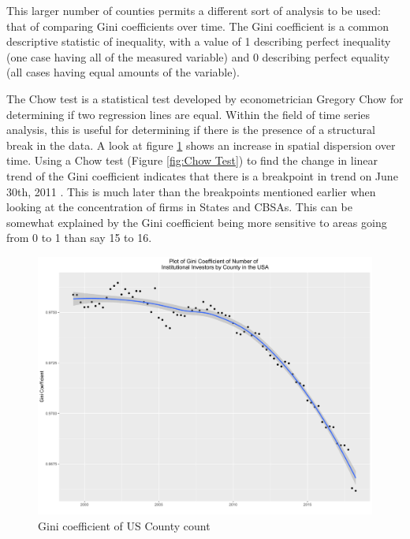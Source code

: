 This larger number of counties permits a different sort of analysis to be used: that of comparing Gini coefficients over time.  The Gini coefficient is a common descriptive statistic of inequality, with a value of 1 describing perfect inequality (one case having all of the measured variable) and 0 describing perfect equality (all cases having equal amounts of the variable). 

The Chow test is a statistical test developed by econometrician Gregory Chow for determining if two regression lines are equal.  Within the field of time series analysis, this is useful for determining if there is the presence of a structural break in the data.  	A look at figure \ref{fig:ginicounty} shows an increase in spatial dispersion over time.  Using a Chow test  (Figure \ref{fig:Chow Test}) to find the change in linear trend of the Gini coefficient indicates that there is a breakpoint in trend on June 30th, 2011  \citep{Chow1960}.  This is much later than the breakpoints mentioned earlier when looking at the concentration of firms in States and CBSAs. 	This can be somewhat explained by the Gini coefficient being more sensitive to areas going from 0 to 1 than say 15 to 16.  




\begin{figure}[h]
	\centering
	\includegraphics[width=1\textwidth]{Figures/ChapterIII/GINI_County}
	\caption[Gini Coefficient of US County Count]{Gini coefficient of US County count}
	\label{fig:ginicounty}
\end{figure}


